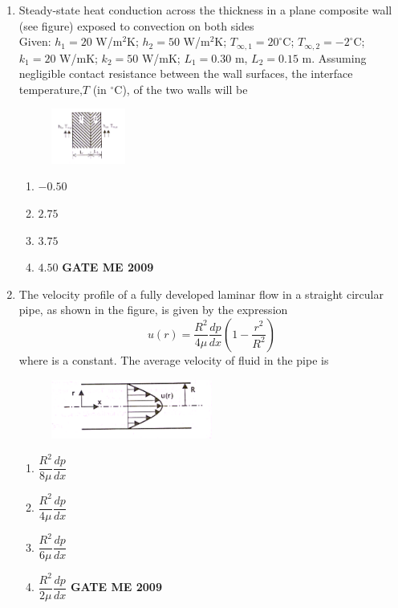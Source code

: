 \documentclass[journal]{IEEEtran}
\begin{document}
\begin{enumerate}[leftmargin=0pt]
\item Steady-state heat conduction across the thickness in a plane composite wall (see figure) exposed to convection on both sides\\Given: $h_1 = 20$ W/m$^2$K; $h_2 = 50$ W/m$^2$K; $T_{\infty,1}=20^\circ$C; $T_{\infty,2}=-2^\circ$C; $k_1 = 20$ W/mK; $k_2 = 50$ W/mK; $L_1 = 0.30$ m, $L_2 = 0.15$ m. Assuming negligible contact resistance between the wall surfaces, the interface temperature,$T$ (in $^\circ$C), of the two walls will be 
\begin{figure}[h]
  \centering
  \includegraphics[width=0.23\textwidth]{Figs/image (5).png}
\end{figure}


\begin{enumerate}[label=(\Alph*)]
  \item $-0.50$
  \item $2.75$
  \item $3.75$
  \item $4.50$
\hfill{\textbf{GATE ME 2009}}
\end{enumerate}



\item The velocity profile of a fully developed laminar flow in a straight circular pipe, as shown in the figure, is given by the expression
\[
u(r) = \frac{R^2}{4\mu} \frac{dp}{dx} \left(1 - \frac{r^2}{R^2}\right)
\]
where is a constant. The average velocity of fluid in the pipe is
\begin{figure}[h]
  \centering
  \includegraphics[width=0.5\textwidth]{Figs/image (6).png}
\end{figure}


\begin{enumerate}[label=(\Alph*)]
  \item $\dfrac{R^2}{8\mu} \dfrac{dp}{dx}$
  \item $\dfrac{R^2}{4\mu} \dfrac{dp}{dx}$
  \item $\dfrac{R^2}{6\mu} \dfrac{dp}{dx}$
  \item $\dfrac{R^2}{2\mu} \dfrac{dp}{dx}$
\hfill{\textbf{GATE ME 2009}}
\end{enumerate}






\end{enumerate}
\end{document}
